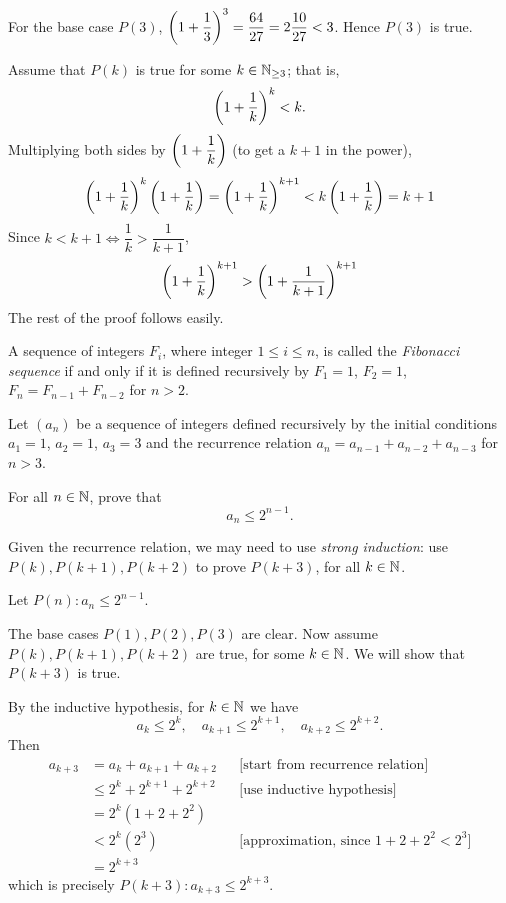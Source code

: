 \begin{solution}
For the base case $P(3)$, $\left(1+\dfrac{1}{3}\right)^3=\dfrac{64}{27}=2\dfrac{10}{27}<3$. Hence $P(3)$ is true.

Assume that $P(k)$ is true for some $k\in\mathbb N_{\ge3}$; that is,
\[\left(1+\frac{1}{k}\right)^k<k.\]
Multiplying both sides by $\left(1+\dfrac{1}{k}\right)$ (to get a $k+1$ in the power),
\[ \left(1+\frac{1}{k}\right)^k\left(1+\frac{1}{k}\right)=\left(1+\frac{1}{k}\right)^{k+1}<k\left(1+\frac{1}{k}\right)=k+1  \]
Since $k<k+1 \iff \dfrac{1}{k}>\dfrac{1}{k+1}$, 
\[ \left(1+\frac{1}{k}\right)^{k+1} > \left(1+\frac{1}{k+1}\right)^{k+1} \]
The rest of the proof follows easily.
\end{solution}

A sequence of integers $F_i$, where integer $1\le i\le n$, is called the \emph{Fibonacci sequence} if and only if it is defined recursively by $F_1=1$, $F_2=1$, $F_n=F_{n-1}+F_{n-2}$ for $n>2$.

\begin{exercise}
Let $(a_n)$ be a sequence of integers defined recursively by the initial conditions $a_1=1$, $a_2=1$, $a_3=3$ and the recurrence relation $a_n=a_{n-1}+a_{n-2}+a_{n-3}$ for $n>3$.

For all $n\in\mathbb N$, prove that
\[ a_n\le2^{n-1}. \]
\end{exercise}

\begin{idea}
Given the recurrence relation, we may need to use \emph{strong induction}: use $P(k),P(k+1),P(k+2)$ to prove $P(k+3)$, for all $k\in\mathbb N$.
\end{idea}

\begin{solution}
Let $P(n):a_n\le2^{n-1}$.

The base cases $P(1),P(2),P(3)$ are clear. Now assume $P(k),P(k+1),P(k+2)$ are true, for some $k\in\mathbb N$. We will show that $P(k+3)$ is true. 

By the inductive hypothesis, for $k\in\mathbb N$ we have
\[a_k\le2^k,\quad a_{k+1}\le2^{k+1},\quad a_{k+2}\le2^{k+2}.\]
Then
\begin{align*}
a_{k+3}&=a_k+a_{k+1}+a_{k+2}&&\text{[start from recurrence relation]} \\
&\le 2^k+2^{k+1}+2^{k+2}&&\text{[use inductive hypothesis]} \\
&=2^k(1+2+2^2)\\
&<2^k(2^3)&&\text{[approximation, since $1+2+2^2<2^3$]} \\
&=2^{k+3}
\end{align*}
which is precisely $P(k+3):a_{k+3}\le2^{k+3}$.
\end{solution}

